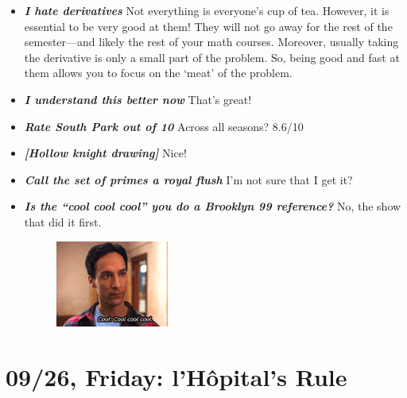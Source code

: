 \documentclass[11pt,letterpaper]{article}
\begin{document}
\begin{itemize}
\item {\bfseries\itshape I hate derivatives} Not everything is everyone's cup of tea. However, it is essential to be very good at them! They will not go away for the rest of the semester---and likely the rest of your math courses. Moreover, usually taking the derivative is only a small part of the problem. So, being good and fast at them allows you to focus on the `meat' of the problem.

\item {\bfseries\itshape I understand this better now} That's great!

\item {\bfseries\itshape Rate South Park out of 10} Across all seasons? 8.6/10

\item {\bfseries\itshape [Hollow knight drawing]} Nice!

\item {\bfseries\itshape Call the set of primes a royal flush} I'm not sure that I get it?

\item {\bfseries\itshape Is the ``cool cool cool'' you do a Brooklyn 99 reference?} No, the show that did it first.
	\begin{figure}[H]
	\centering
	\includegraphics[width=0.35\textwidth]{images/coolcoolcool.png}
	\end{figure}
\end{itemize}

\newpage
\section*{09/26, Friday: l'H\^{o}pital's Rule\label{09-26}}
\end{document}
